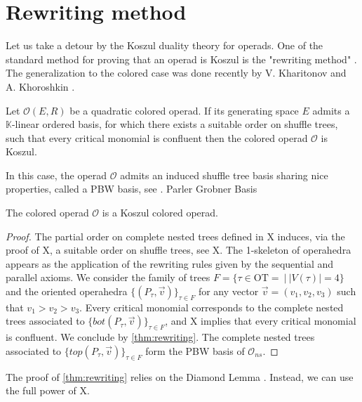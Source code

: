 
\section{Rewriting method} 
\label{s:rewriting}


Let us take a detour by the Koszul duality theory for operads. One of the standard method for proving that an operad is Koszul is the "rewriting method" \cite[Section 8.3]{LodayVallette12}. The generalization to the colored case was done recently by V. Kharitonov and A. Khoroshkin \cite[Theorem 3.12]{KhariKhoro20}.

\begin{thm} \label{thm:rewriting} Let $\mathcal{O}(E,R)$ be a quadratic colored operad. If its generating space $E$ admits a $\mathbb{K}$-linear ordered basis, for which there exists a suitable order on shuffle trees, such that every critical monomial is confluent then the colored operad $\mathcal{O}$ is Koszul. 
\end{thm}

In this case, the operad $\mathcal{O}$ admits an induced shuffle tree basis sharing nice properties, called a PBW basis, see \cite[Section 8.5.3]{LodayVallette12}. Parler Grobner Basis

\begin{thm} \label{thm:Koszulrewriting} The colored operad $\mathcal{O}$ is a Koszul colored operad. 
\end{thm}
\begin{proof} The partial order on complete nested trees defined in X induces, via the proof of X, a suitable order on shuffle trees, see X. The 1-skeleton of operahedra appears as the application of the rewriting rules given by the sequential and parallel axioms. We consider the family of trees $F=\{\tau \in \mathrm{OT}=\ | \ |V(\tau)|=4\}$ and the oriented operahedra $\{(P_\tau,\vec v)\}_{\tau \in F}$ for any vector $\vec v=(v_1,v_2,v_3)$ such that $v_1>v_2>v_3$. Every critical monomial corresponds to the complete nested trees associated to $\{bot(P_\tau,\vec v)\}_{\tau \in F}$, and X implies that every critical monomial is confluent. We conclude by \cref{thm:rewriting}. 
The complete nested trees associated to $\{top(P_\tau, \vec v)\}_{\tau \in F}$ form the PBW basis of $\mathcal{O}_{ns}$.
\end{proof}

The proof of \cref{thm:rewriting} relies on the Diamond Lemma \cite[Theorem 8.5.5]{LodayVallette12}. Instead, we can use the full power of X.

